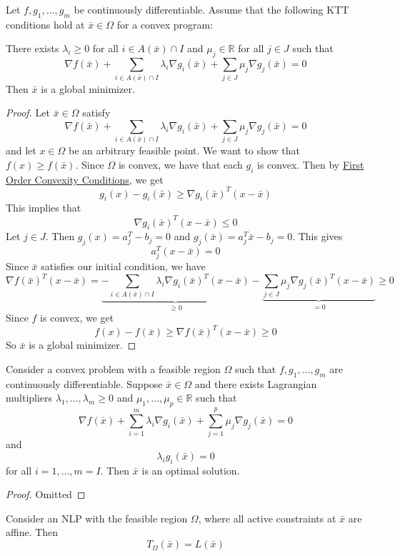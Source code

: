 \begin{theorem}[]
    Let $f, g_1,\ldots,g_m$ be continuously differentiable. Assume that the following KTT conditions hold at $\bar x \in \Omega$ for a convex program:

    There exists $\lambda_i \geq 0$ for all $i \in A(\bar x) \cap I$ and $\mu_j \in \mathbb R$ for all $j \in J$ such that $$\nabla f(\bar x) + \sum_{i \in A(\bar x) \cap I} \lambda_i \nabla g_i(\bar x) + \sum_{j \in J} \mu_j \nabla g_j(\bar x) = 0$$
    Then $\bar x$ is a global minimizer.
\end{theorem}
\begin{proof}[Proof]
    Let $\bar x \in \Omega$ satisfy $$\nabla f(\bar x) + \sum_{i \in A(\bar x) \cap I} \lambda_i \nabla g_i(\bar x) + \sum_{j \in J} \mu_j \nabla g_j(\bar x) = 0$$ and let $x \in \Omega$ be an arbitrary feasible point. We want to show that $f(x) \geq f(\bar x)$. Since $\Omega$ is convex, we have that each $g_i$ is convex. Then by \hyperref[thm:first-order-convex]{First Order Convexity Conditions}, we get 
    $$g_i(x) - g_i(\bar x) \geq \nabla g_i(\bar x)^T (x - \bar x)$$ This implies that $$\nabla g_i(\bar x)^T (x - \bar x) \leq 0$$
    Let $j \in J$. Then $g_j(x) = a_j^T - b_j = 0$ and $g_j(\bar x) = a_j^T \bar x - b_j = 0$. This gives $$a_j^T (x - \bar x) = 0$$ Since $\bar x$ satisfies our initial condition, we have 
    $$\nabla f(\bar x)^T (x - \bar x) = \underbrace{-\sum_{i \in A(\bar x) \cap I} \lambda_i \nabla g_i(\bar x)^T (x - \bar x)}_{\geq 0} - \underbrace{\sum_{j \in J} \mu_j \nabla g_j(\bar x)^T (x - \bar x)}_{= 0} \geq 0$$
    Since $f$ is convex, we get $$f(x) - f(\bar x) \geq \nabla f(\bar x)^T (x - \bar x) \geq 0$$ So $\bar x$ is a global minimizer.
\end{proof}
\begin{theorem}[]
    Consider a convex problem with a feasible region $\Omega$ such that $f, g_1,\ldots,g_m$ are continuously differentiable. Suppose $\bar x \in \Omega$ and there exists Lagrangian multipliers $\lambda_1,\ldots, \lambda_m \geq 0$ and $\mu_1,\ldots,\mu_p \in \mathbb R$ such that $$\nabla f(\bar x) + \sum^m_{i=1} \lambda_i \nabla g_i(\bar x) + \sum^p_{j=1} \mu_j \nabla g_j(\bar x) = 0$$ and $$\lambda_i g_i(\bar x) = 0$$ for all $i = 1,\ldots,m = I$. Then $\bar x$ is an optimal solution.
\end{theorem}
\begin{proof}[Proof]
    Omitted
\end{proof}
\begin{theorem}[]
    Consider an NLP with the feasible region $\Omega$, where all active constraints at $\bar x$ are affine. Then $$T_\Omega(\bar x) = L(\bar x)$$
\end{theorem}
